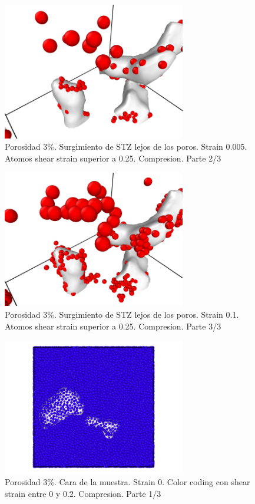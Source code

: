 \documentclass[10pt, oneside]{article} %
\begin{document}
\begin{figure}[H]
\centering
\includegraphics[width=8cm]{Figures/porosidad_STZObservation_3_0005.png}
\caption{Porosidad 3\%. Surgimiento de STZ lejos de los poros. Strain 0.005. Atomos shear strain superior a 0.25. Compresion. Parte 2/3}
\end{figure}

\begin{figure}[H]
\centering
\includegraphics[width=8cm]{Figures/porosidad_STZObservation_3_01.png}
\caption{Porosidad 3\%. Surgimiento de STZ lejos de los poros. Strain 0.1. Atomos shear strain superior a 0.25. Compresion. Parte 3/3}
\end{figure}

\begin{figure}[H]
\centering
\includegraphics[width=8cm]{Figures/porosidad_3_faceAS_0_02.png}
\caption{Porosidad 3\%. Cara de la muestra. Strain 0. Color coding con shear strain entre 0 y 0.2. Compresion. Parte 1/3}
\end{figure}
\end{document}

